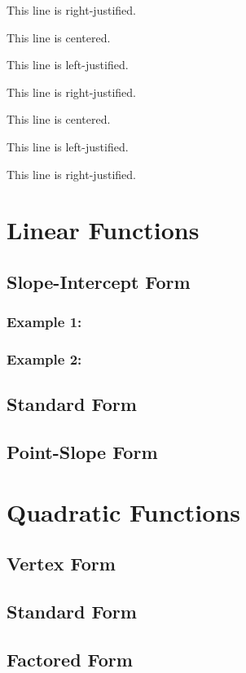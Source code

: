 \documentclass[12pt]{article}
\begin{document}
\begin{flushright}
This line is  right-justified.
\end{flushright}

\centering
This line is centered.

This line is left-justified.

This line is  right-justified.

\flushleft
This line is centered.

This line is left-justified.

This line is  right-justified.


\section{Linear Functions}
	\subsection{Slope-Intercept Form}
		\subsubsection{Example 1:}
		\subsubsection{Example 2:}
	\subsection{Standard Form}
	\subsection{Point-Slope Form}
\section*{Quadratic Functions}
	\subsection*{Vertex Form}
	\subsection*{Standard Form}
	\subsection*{Factored Form}
\end{document}
